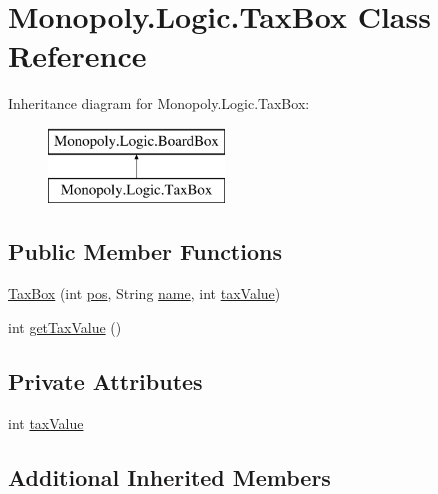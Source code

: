 \hypertarget{class_monopoly_1_1_logic_1_1_tax_box}{}\section{Monopoly.\+Logic.\+Tax\+Box Class Reference}
\label{class_monopoly_1_1_logic_1_1_tax_box}
Inheritance diagram for Monopoly.\+Logic.\+Tax\+Box\+:\begin{figure}[H]
\begin{center}
\leavevmode
\includegraphics[height=2.000000cm]{class_monopoly_1_1_logic_1_1_tax_box}
\end{center}
\end{figure}
\subsection*{Public Member Functions}
\begin{DoxyCompactItemize}
\item 
\hyperlink{class_monopoly_1_1_logic_1_1_tax_box_a26c6a8264302ee2298e8368ef9e2c5e8}{Tax\+Box} (int \hyperlink{class_monopoly_1_1_logic_1_1_board_box_a750c8300a134809e0eb5772b3ba92258}{pos}, String \hyperlink{class_monopoly_1_1_logic_1_1_board_box_ad5cd8d9fc191dc2df82b9fe7766210fd}{name}, int \hyperlink{class_monopoly_1_1_logic_1_1_tax_box_a006558e6ac0b75b55480cc0fced64115}{tax\+Value})
\item 
int \hyperlink{class_monopoly_1_1_logic_1_1_tax_box_a3e7d5fe75e6a1d91b94b2363c06e8651}{get\+Tax\+Value} ()
\end{DoxyCompactItemize}
\subsection*{Private Attributes}
\begin{DoxyCompactItemize}
\item 
int \hyperlink{class_monopoly_1_1_logic_1_1_tax_box_a006558e6ac0b75b55480cc0fced64115}{tax\+Value}
\end{DoxyCompactItemize}
\subsection*{Additional Inherited Members}



